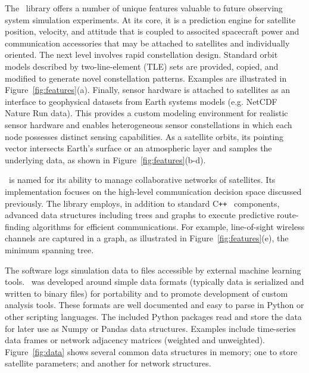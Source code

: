 \documentclass[conference]{IEEEtran}
\newcommand{\project}{{\sc{Collaborate}}~}
\newcommand{\cpp}{C\texttt{++}~}
\begin{document}
The \project library offers a number of unique features valuable to future
observing system simulation experiments.  At its core, it is a prediction engine
for satellite position, velocity, and attitude that is coupled to associted spacecraft 
power and communication accessories that may be
attached to satellites and individually oriented.  The next level involves rapid
constellation design.  Standard orbit models described by two-line-element (TLE)
sets are provided, copied, and modified to generate novel 
constellation patterns.  Examples are illustrated in
Figure~\ref{fig:features}(a).  Finally, sensor hardware is attached to satellites as an
interface to geophysical datasets from Earth systems models (e.g. NetCDF Nature Run data).  This provides a custom
modeling environment for realistic sensor hardware and enables heterogeneous sensor
constellations in which each node possesses distinct sensing capabilities.  As a satellite orbits, its pointing
vector intersects Earth's surface or an atmospheric layer and samples the
underlying data, as shown in Figure~\ref{fig:features}(b-d).

\project is named for its ability to manage collaborative networks of
satellites.  Its implementation focuses on the high-level communication decision
space discussed previously.  The library employs, in addition to standard \cpp
components, advanced data structures including trees and graphs to execute
predictive route-finding algorithms for efficient communications.  For example,
line-of-sight wireless channels are captured in a graph, as illustrated in
Figure~\ref{fig:features}(e), the minimum spanning tree.

The software logs simulation data to files accessible by external machine
learning tools.  \project was developed around simple data formats (typically data is serialized and written to binary files) for
portability and to promote development of custom analysis tools.  
These formats are well
documented and easy to parse in Python or other scripting languages.  The included
Python packages read and store the data for
later use as Numpy or Pandas data structures.  Examples include time-series data
frames or network adjacency matrices (weighted and unweighted).
Figure~\ref{fig:data} shows several common data structures in memory; one to
store satellite parameters; and another for network structures.
\end{document}
